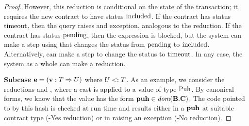 \begin{proof}
  However, this reduction is conditional on the state of the
  transaction; it requires the new contract to have status
  $\text{included}$. If the contract has status $\text{timeout}$, then
  the query raises and exception, analogous to the
   reduction. If the contract has status
  $\text{pending}$, then the expression is blocked, but the system can
  make a step using  that changes the
  status from $\text{pending}$ to $\text{included}$. Alternatively,
   can make a step to change the status to
  $\text{timeout}$. In any case, the system as a whole can make a reduction.

  \bigskip\textbf{Subcase } $\textbf{e} = (\textbf{v} : T \Rightarrow U)$ where $U <: T$.
  As an example, we consider the reductions  and
  , where a cast is applied to a value of type
  $\text{Puh}$. By canonical forms, we know that the value has the
  form $\textbf{puh} \in \textit{dom} (\textbf{B}.\textbf{C})$. The code pointed to
  by this hash is checked at run time and results either in a $\textbf{puh}$
  at suitable contract type (-Yes reduction) or in raising an
  exception (-No reduction). 

\end{proof}


